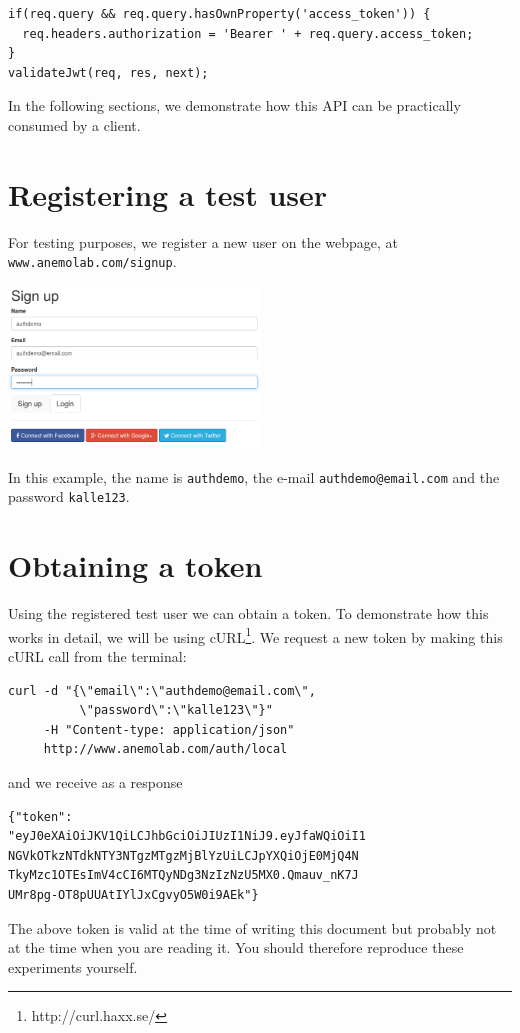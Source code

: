 \documentclass{article}
\begin{document}
\begin{verbatim}
if(req.query && req.query.hasOwnProperty('access_token')) {
  req.headers.authorization = 'Bearer ' + req.query.access_token;
}
validateJwt(req, res, next);
\end{verbatim}
In the following sections, we demonstrate how this API can be practically consumed by a client.
\section{Registering a test user}
For testing purposes, we register a new user on the webpage, at \texttt{www.anemolab.com/signup}.
\begin{center}
\includegraphics[width=0.5\textwidth]{signup.png}
\end{center}

In this example, the name is \texttt{authdemo}, the e-mail \texttt{authdemo@email.com} and the password \texttt{kalle123}.
\section{Obtaining a token}
Using the registered test user we can obtain a token. To demonstrate how this works in detail, we will be using cURL\footnote{http://curl.haxx.se/}. We request a new token by making this cURL call from the terminal:
\begin{verbatim}
curl -d "{\"email\":\"authdemo@email.com\",
          \"password\":\"kalle123\"}" 
     -H "Content-type: application/json" 
     http://www.anemolab.com/auth/local
\end{verbatim}
and we receive as a response
\begin{verbatim}
{"token":
"eyJ0eXAiOiJKV1QiLCJhbGciOiJIUzI1NiJ9.eyJfaWQiOiI1
NGVkOTkzNTdkNTY3NTgzMTgzMjBlYzUiLCJpYXQiOjE0MjQ4N
TkyMzc1OTEsImV4cCI6MTQyNDg3NzIzNzU5MX0.Qmauv_nK7J
UMr8pg-OT8pUUAtIYlJxCgvyO5W0i9AEk"}
\end{verbatim}
The above token is valid at the time of writing this document but probably not at the time when you are reading it. You should therefore reproduce these experiments yourself.
\end{document}
